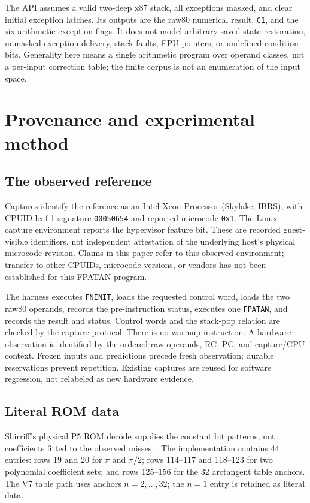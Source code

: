 \documentclass[11pt]{article}
\newcommand{\insn}[1]{\texttt{#1}}
\newcommand{\hex}[1]{\texttt{#1}}
\begin{document}
The API assumes a valid two-deep x87 stack, all exceptions masked, and clear
initial exception latches. Its outputs are the raw80 numerical result,
\insn{C1}, and the six arithmetic exception flags. It does not model arbitrary
saved-state restoration, unmasked exception delivery, stack faults, FPU
pointers, or undefined condition bits. Generality here means a single
arithmetic program over operand classes, not a per-input correction table;
the finite corpus is not an enumeration of the input space.

\section{Provenance and experimental method}
\label{sec:method}

\subsection{The observed reference}

Captures identify the reference as an Intel Xeon Processor (Skylake, IBRS),
with CPUID leaf-1 signature \hex{00050654} and reported microcode \hex{0x1}.
The Linux capture environment reports the hypervisor feature bit. These
are recorded guest-visible identifiers, not independent attestation of
the underlying host's physical microcode revision. Claims in this paper
refer to this observed environment; transfer to other CPUIDs, microcode
versions, or vendors has not been established for this FPATAN program.

The harness executes \insn{FNINIT}, loads the requested control word, loads
the two raw80 operands, records the pre-instruction status, executes one
\insn{FPATAN}, and records the result and status. Control words and the
stack-pop relation are checked by the capture protocol. There is no warmup
instruction. A hardware observation is identified by the ordered raw
operands, RC, PC, and capture/CPU context. Frozen inputs and predictions
precede fresh observation; durable reservations prevent repetition.
Existing captures are reused for software regression, not relabeled as new
hardware evidence.

\subsection{Literal ROM data}
\label{sec:rom}

Shirriff's physical P5 ROM decode supplies the constant bit patterns, not
coefficients fitted to the observed misses~\cite{shirriff}. The implementation
contains 44 entries: rows 19 and 20 for $\pi$ and $\pi/2$; rows 114--117 and
118--123 for two polynomial coefficient sets; and rows 125--156 for the
32 arctangent table anchors. The V7 table path uses anchors $n=2,\ldots,32$;
the $n=1$ entry is retained as literal data.
\end{document}
